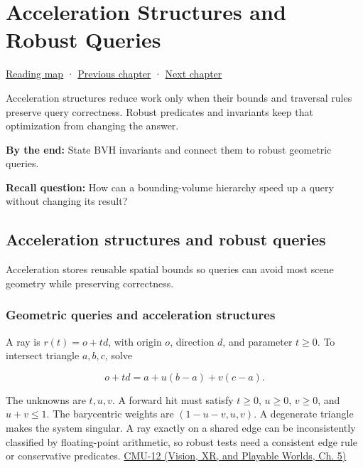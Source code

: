 \chapter{Acceleration Structures and Robust Queries}\label{04-visual-computing-ii-ch029-acceleration-structures-and-robust-queries}\hypertarget{04-visual-computing-ii-ch029}{}\label{stagechapter:04-visual-computing-ii-ch029}

\hyperref[volume-reading-map]{Reading map} · \hyperref[04-visual-computing-ii-ch028-visibility-queries-and-ray-intersections]{Previous chapter} · \hyperref[04-visual-computing-ii-ch030-mesh-operators-boundaries-and-diffusion]{Next chapter}

Acceleration structures reduce work only when their bounds and traversal rules preserve query correctness. Robust predicates and invariants keep that optimization from changing the answer.

\textbf{By the end:} State BVH invariants and connect them to robust geometric queries.

\textbf{Recall question:} How can a bounding-volume hierarchy speed up a query without changing its result?

\section{Acceleration structures and robust queries}\label{04-visual-computing-ii-ch029-acceleration-structures-and-robust-queries-1}

Acceleration stores reusable spatial bounds so queries can avoid most scene geometry while preserving correctness.

\subsection{Geometric queries and acceleration structures}\label{04-visual-computing-ii-ch029-geometric-queries-and-acceleration-structures}

A ray is \(r(t)=o+td\), with origin \(o\), direction \(d\), and parameter \(t\ge0\). To intersect triangle \(a,b,c\), solve

\[
o+td=a+u(b-a)+v(c-a).
\]

The unknowns are \(t,u,v\). A forward hit must satisfy \(t\ge0\), \(u\ge0\), \(v\ge0\), and \(u+v\le1\). The barycentric weights are \((1-u-v,u,v)\). A degenerate triangle makes the system singular. A ray exactly on a shared edge can be inconsistently classified by floating-point arithmetic, so robust tests need a consistent edge rule or conservative predicates. \href{../07-Vision-XR-and-Playable-Worlds/main.pdf\#nameddest=04-visual-computing-ii-ch036-cmu-12---geometric-queries}{CMU-12 (Vision, XR, and Playable Worlds, Ch. 5)}


